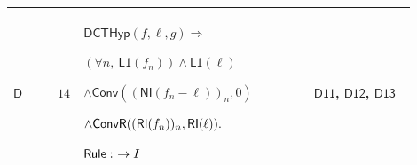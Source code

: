 \documentclass[12pt,reqno]{amsart}
\theoremstyle{blueplain}
\numberwithin{equation}{section}
\begin{document}
{\scriptsize \setlength{\parskip}{0pt}\nointerlineskip
\noindent 
\begin{tabular}{|@{}>{\centering\arraybackslash}m{0.10658\linewidth}|>{\centering\arraybackslash}m{0.03553\linewidth}|>{\centering\arraybackslash}m{0.52105\linewidth}|>{\centering\arraybackslash}m{0.23684\linewidth}|}
\hline
\hypertarget{dct:D14}{$\displaystyle \mathsf{D}$} & $\displaystyle 14$ & $%
\displaystyle \mathsf{DCTHyp}(f,\ell,g)\Rightarrow$\par$\displaystyle %
(\forall n,\ \mathsf{L1}(f_n))\land\mathsf{L1}(\ell)$\par$\displaystyle \land%
\mathsf{Conv}((\mathsf{NI}(f_n-\ell))_n,0)$\par$\displaystyle \land\mathsf{%
ConvR}((\mathsf{RI}(f_n))_n,\mathsf{RI}(\ell)).$\par$\displaystyle \mathsf{%
Rule}:\ \to I$ & \hyperlink{dct:D11}{$\displaystyle \mathsf{D11}$}, 
\hyperlink{dct:D12}{$\displaystyle \mathsf{D12}$}, \hyperlink{dct:D13}{$%
\displaystyle \mathsf{D13}$} \\ \hline
\end{tabular}%
}

{\scriptsize \ }
\end{document}
